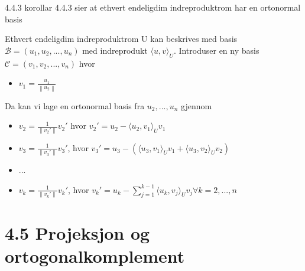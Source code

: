 \documentclass[a4paper,norsk]{article}
\begin{document}
\begin{oppgavebox}{4.4.3}{}
korollar 4.4.3 sier at ethvert endeligdim indreproduktrom har en ortonormal basis

\begin{proofbox}
    Ethvert endeligdim indreproduktrom U kan beskrives med basis $ \mathcal{B} =  \left( u_1, u_2, ..., u_n \right) $ med indreprodukt $ \langle u, v \rangle_{ U }  $. Introduser en ny basis $ \mathcal{C} = \left( v_1, v_2, ..., v_n \right)  $ hvor 
    \begin{itemize}
        \item $ v_1 = \frac{ u_1 }{ \left\lVert u_2 \right\rVert  } $ 
    \end{itemize}
    Da kan vi lage en ortonormal basis fra $ u_2, ..., u_n $ gjennom 

    \begin{itemize}
        \item $ v_2 = \frac{ 1 }{ \left\lVert v_2' \right\rVert  } v_2'$ hvor $ v_2' = u_2 - \langle u_2,v_1  \rangle_{ U } v_1  $  
        \item $ v_3 = \frac{ 1 }{ \left\lVert v_3' \right\rVert  } v_3' $, hvor $ v_3' = u_3 - \left( \langle u_3, v_1 \rangle_{ U } v_1 + \langle u_3, v_2 \rangle_{ U } v_2 \right)  $  
        \item ...
        \item $ v_k = \frac{ 1 }{ \left\lVert v_k' \right\rVert  } v_k' $, hvor $ v_k' = u_k - \sum_{ j=1 }^{ k-1 } \langle u_k, v_j \rangle_{ U } v_j   \forall k=2,..., n$  
    \end{itemize} 
\end{proofbox}

\end{oppgavebox}

\section*{4.5 Projeksjon og ortogonalkomplement}
\end{document}
